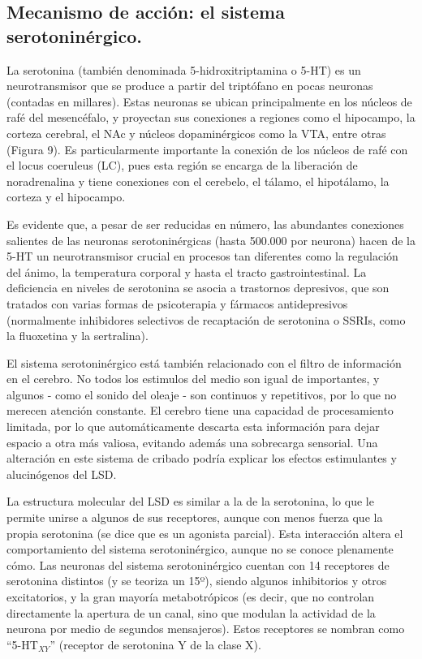 \subsection{Mecanismo de acción: el sistema serotoninérgico.}

La serotonina (también denominada 5-hidroxitriptamina o 5-HT) es un neurotransmisor que se produce a partir del triptófano en pocas neuronas (contadas en millares). Estas neuronas se ubican principalmente en los núcleos de rafé del mesencéfalo, y proyectan sus conexiones a regiones como el hipocampo, la corteza cerebral, el NAc y núcleos dopaminérgicos como la VTA, entre otras (Figura 9). Es particularmente importante la conexión de los núcleos de rafé con el locus coeruleus (LC), pues esta región se encarga de la liberación de noradrenalina y tiene conexiones con el cerebelo, el tálamo, el hipotálamo, la corteza y el hipocampo.

Es evidente que, a pesar de ser reducidas en número, las abundantes conexiones salientes de las neuronas serotoninérgicas (hasta 500.000 por neurona) hacen de la 5-HT un neurotransmisor crucial en procesos tan diferentes como la regulación del ánimo, la temperatura corporal y hasta el tracto gastrointestinal. La deficiencia en niveles de serotonina se asocia a trastornos depresivos, que son tratados con varias formas de psicoterapia y fármacos antidepresivos (normalmente inhibidores selectivos de recaptación de serotonina o SSRIs, como la fluoxetina y la sertralina).

El sistema serotoninérgico está también relacionado con el filtro de información en el cerebro. No todos los estimulos del medio son igual de importantes, y algunos - como el sonido del oleaje - son continuos y repetitivos, por lo que no merecen atención constante. El cerebro tiene una capacidad de procesamiento limitada, por lo que automáticamente descarta esta información para dejar espacio a otra más valiosa, evitando además una sobrecarga sensorial. Una alteración en este sistema de cribado podría explicar los efectos estimulantes y alucinógenos del LSD.

La estructura molecular del LSD es similar a la de la serotonina, lo que le permite unirse a algunos de sus receptores, aunque con menos fuerza que la propia serotonina (se dice que es un agonista parcial). Esta interacción altera el comportamiento del sistema serotoninérgico, aunque no se conoce plenamente cómo. Las neuronas del sistema serotoninérgico cuentan con 14 receptores de serotonina distintos (y se teoriza un 15º), siendo algunos inhibitorios y otros excitatorios, y la gran mayoría metabotrópicos (es decir, que no controlan directamente la apertura de un canal, sino que modulan la actividad de la neurona por medio de segundos mensajeros). Estos receptores se nombran como \enquote{5-HT$_{XY}$} (receptor de serotonina Y de la clase X).

